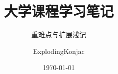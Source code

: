 \documentclass{note}
\title{大学课程学习笔记}
\subtitle{重难点与扩展浅记}
\author{ExplodingKonjac}
\date{\today}
\begin{document}
\begin{titlingpage}
	\maketitle
\end{titlingpage}

\tableofcontents






\end{document}
